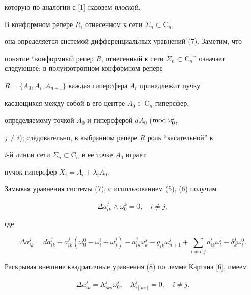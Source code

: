 которую по аналогии с [1] назовем {\it плоской}. 


 


В конформном репере $R$, отнесенном к сети $\Sigma_n\subset\mathrm C_n$, 


она определяется системой дифференциальных уравнений (7). Заметим, что 


понятие ``конформный репер $R$, отнесенный к сети $\Sigma_n\subset\mathrm 


C_n$'' означает следующее: в полуизотропном конформном репере 


$R=\{A_0,A_i,A_{n+1}\}$ каждая гиперсфера $A_i$ принадлежит пучку 


касающихся между собой в его центре $A_0\in \mathrm C_n$ гиперсфер, 


определяемому точкой $A_0$ и гиперсферой $dA_0$ ($\operatorname{mod}\omega^j_0$, 


$j\ne i$); следовательно, в выбранном репере $R$ роль ``касательной'' к 


$i$-й линии сети $\Sigma_n\subset\mathrm C_n$ в ее точке $A_0$ играет 


пучок гиперсфер $X_i=A_i+\lambda_i A_0$. 


 


Замыкая уравнения системы (7), с использованием (5), (6) получим 


\begin{equation} 


\Delta a^j_{ik}\wedge\omega^k_0=0,\quad i\ne j, 


\end{equation} 


где 


\begin{equation} 


\Delta a^j_{ik}=da^j_{ik}+a^j_{ik}(\omega^0_0-\omega^i_i+ 


\omega^j_j)-a^j_{is}\omega^s_k-g_{ik}\omega^j_{n+1}+ 


\sum_{t\ne i,j}a^t_{ik}\omega^j_t 


-\delta^j_k\omega^0_i. 


\end{equation} 


Раскрывая внешние квадратичные уравнения (8) по лемме Картана [6], имеем 


\begin{equation} 


\Delta a^j_{ik}=\mathrm A^j_{iks}\omega^s_0,\quad 


\mathrm A^j_{i[ks]}=0,\quad i\ne j. 


\end{equation} 


